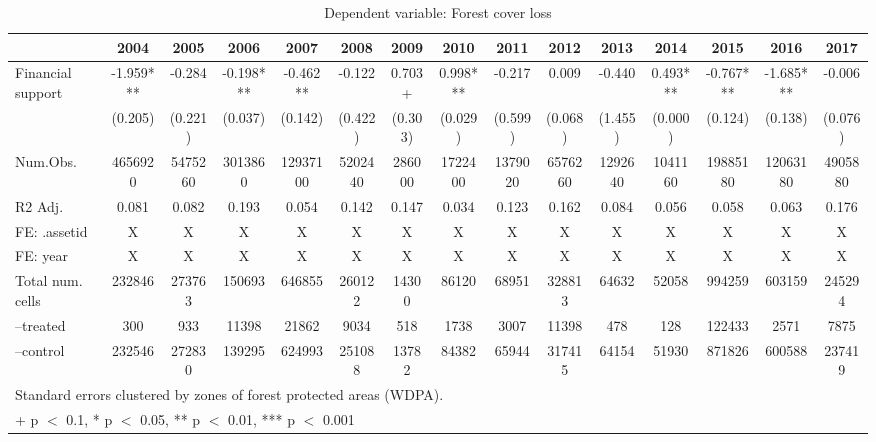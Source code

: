 \documentclass{article}
\begin{document}
\begin{landscape}

\begin{table}[H]
\caption{Dependent variable: Forest cover loss}
\label{tab:main_reg}

\centering
\begin{tabular}[t]{lcccccccccccccc}
\toprule
  & 2004 & 2005 & 2006 & 2007 & 2008 & 2009 & 2010 & 2011 & 2012 & 2013 & 2014 & 2015 & 2016 & 2017\\
\midrule
Financial support & -1.959*** & -0.284 & -0.198*** & -0.462** & -0.122 & 0.703+ & 0.998*** & -0.217 & 0.009 & -0.440 & 0.493*** & -0.767*** & -1.685*** & -0.006\\
& (0.205) & (0.221) & (0.037) & (0.142) & (0.422) & (0.303) & (0.029) & (0.599) & (0.068) & (1.455) & (0.000) & (0.124) & (0.138) & (0.076)\\
\midrule
Num.Obs. & 4656920 & 5475260 & 3013860 & 12937100 & 5202440 & 286000 & 1722400 & 1379020 & 6576260 & 1292640 & 1041160 & 19885180 & 12063180 & 4905880\\
R2 Adj. & 0.081 & 0.082 & 0.193 & 0.054 & 0.142 & 0.147 & 0.034 & 0.123 & 0.162 & 0.084 & 0.056 & 0.058 & 0.063 & 0.176\\
FE: .assetid & X & X & X & X & X & X & X & X & X & X & X & X & X & X\\
FE: year & X & X & X & X & X & X & X & X & X & X & X & X & X & X\\
Total num. cells & 232846 & 273763 & 150693 & 646855 & 260122 & 14300 & 86120 & 68951 & 328813 & 64632 & 52058 & 994259 & 603159 & 245294\\
--treated & 300 & 933 & 11398 & 21862 & 9034 & 518 & 1738 & 3007 & 11398 & 478 & 128 & 122433 & 2571 & 7875\\
--control & 232546 & 272830 & 139295 & 624993 & 251088 & 13782 & 84382 & 65944 & 317415 & 64154 & 51930 & 871826 & 600588 & 237419\\
\bottomrule
\multicolumn{10}{l}{\rule{0pt}{1em}Standard errors clustered by zones of forest protected areas (WDPA).}\\
\multicolumn{10}{l}{\rule{0pt}{1em}+ p $<$ 0.1, * p $<$ 0.05, ** p $<$ 0.01, *** p $<$ 0.001}\\
\end{tabular}


\end{table}
\end{landscape}



\end{document}
